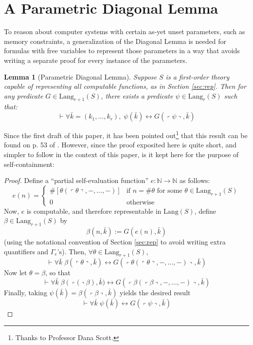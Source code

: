 \documentclass[onecolumn]{miri-tech-article}
\newtheorem{lemma}[theorem]{Lemma}
\numberwithin{equation}{section}
\theoremstyle{definition}
\newcommand{\NN}{\mathbb{N}}
\newcommand{\proves}[1]{\underset{#1}{\vdash}}
\newcommand{\Lang}{\mathrm{Lang}}
\renewcommand{\to}{\rightarrow}
\renewcommand{\iff}{\leftrightarrow}
\newcommand{\qquote}[1]{\left\ulcorner #1 \right\urcorner}
\renewcommand{\-}{^{-1}}
\begin{document}
\section{A Parametric Diagonal Lemma}
To reason about computer systems with certain as-yet unset parameters, such as memory constraints, a generalization of the Diagonal Lemma is needed for formulas with free variables to represent those parameters in a way that avoids writing a separate proof for every instance of the parameters.

\begin{lemma}[Parametric Diagonal Lemma] Suppose $S$ is a first-order theory capable of representing all computable functions, as in Section \ref{sec:rep}.  Then for any predicate $G\in\Lang_{r+1}(S)$, there exists a predicate $\psi\in\Lang_r(S)$ such that: \\
$$\proves{} \forall \bar k = (k_1,\ldots,k_r), \; \psi(\bar k) \iff G(\qquote\psi,\bar k)$$
\end{lemma}

Since the first draft of this paper, it has been pointed out\footnote{Thanks to Professor Dana Scott.} that this result can be found on p. 53 of \cite{Boolos:1993:Logic}.  However, since the proof exposited here is quite short, and simpler to follow in the context of this paper, is it kept here for the purpose of self-containment:

\begin{proof}
Define a ``partial self-evaluation function'' $e:\NN\to\NN$ as follows: 
$$e(n) = \begin{cases} 
\#\left[\theta(\qquote\theta,-,\ldots,-)\right] &\mbox{if } n = \#\theta \text{ for some }\theta\in\Lang_{r+1}(S) \\ 
0 & \mbox{otherwise }
\end{cases}
$$
Now, $e$ is computable, and therefore representable in $\Lang(S)$, define $\beta\in\Lang_{r+1}(S)$ by 
$$\beta(n,\bar k) := G(e(n),\bar k)$$ 
(using the notational convention of Section \ref{sec:rep} to avoid writing extra quantifiers and $\Gamma_e$'s).  Then, $\forall \theta\in\Lang_{r+1}(S)$,
$$\proves{} \forall \bar k\; \beta(\qquote{\theta},\bar k) \iff G(\qquote{\theta(\qquote{\theta},-,\ldots,-)},\bar k)$$
Now let $\theta = \beta$, so that
$$\proves{} \forall \bar k\; \beta(\qquote(\beta),\bar k) \iff G(\qquote{\beta(\qquote{\beta},-,\ldots,-)},\bar k)$$
%
Finally, taking $\psi(\bar k) = \beta(\qquote{\beta},\bar k)$ yields the desired result
$$\proves{} \forall \bar k\; \psi(\bar k) \iff G(\qquote{\psi},\bar k)$$


\end{proof}
\end{document}

